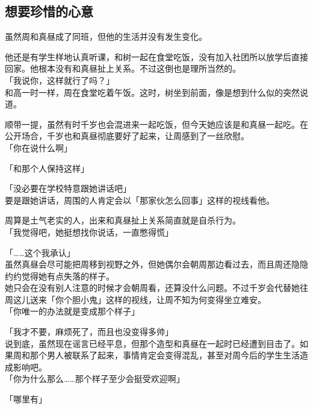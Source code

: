 \subsection{想要珍惜的心意}

虽然周和真昼成了同班，但他的生活并没有发生变化。

他还是有学生样地认真听课，和树一起在食堂吃饭，没有加入社团所以放学后直接回家。他根本没有和真昼扯上关系。不过这倒也是理所当然的。\\

「我说你，这样就行了吗？」\\

和高一时一样，周在食堂吃着午饭。这时，树坐到前面，像是想到什么似的突然说道。

顺带一提，虽然有时千岁也会混进来一起吃饭，但今天她应该是和真昼一起吃。在公开场合，千岁也和真昼彻底要好了起来，让周感到了一丝欣慰。\\

「你在说什么啊」

「和那个人保持这样」

「没必要在学校特意跟她讲话吧」\\

要是跟她讲话，周围的人肯定会以「那家伙怎么回事」这样的视线看他。

周算是土气老实的人，出来和真昼扯上关系简直就是自杀行为。\\

「我觉得吧，她挺想找你说话，一直憋得慌」

「……这个我承认」\\

虽然真昼会尽可能把周移到视野之外，但她偶尔会朝周那边看过去，而且周还隐隐约约觉得她有点失落的样子。\\

她只会在没有别人注意的时候才会朝周看，还算没什么问题。不过千岁会代替她往周这儿送来「你个胆小鬼」这样的视线，让周不知为何变得坐立难安。\\

「你唯一的办法就是变成那个样子」

「我才不要，麻烦死了，而且也没变得多帅」\\

说到底，虽然现在谣言已经平息，但那个造型和真昼在一起时已经遭到目击了。如果周和那个男人被联系了起来，事情肯定会变得混乱，甚至对周今后的学生生活造成影响吧。\\

「你为什么那么……那个样子至少会挺受欢迎啊」

「哪里有」\\


